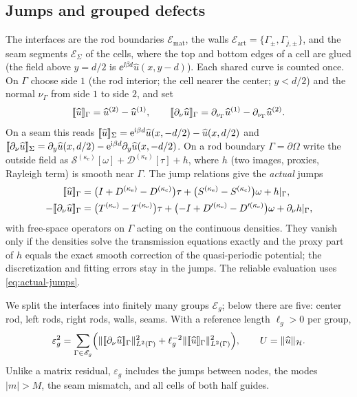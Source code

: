 \subsection{Jumps and grouped defects}\label{sec:jumps}
The interfaces are the rod boundaries $\mathscr E_{\mathrm{mat}}$, the walls
$\mathscr E_{\mathrm{art}}=\{\Gamma_\pm,\Gamma_{j,\pm}\}$, and the seam segments
$\mathscr E_\Sigma$ of the cells, where the top and bottom edges of a cell are
glued (the field above $y=d/2$ is $\ee^{\ii\beta d}\widehat u(x,y-d)$). Each
shared curve is counted once. On $\Gamma$ choose side $1$ (the rod interior;
the cell nearer the center; $y<d/2$) and the normal $\nu_\Gamma$ from side $1$
to side $2$, and set
\begin{equation}\label{eq:jumps}
  \llbracket \widehat u\rrbracket_\Gamma=\widehat u^{(2)}-\widehat u^{(1)},\qquad
  \llbracket \partial_\nu\widehat u\rrbracket_\Gamma=\partial_{\nu_\Gamma}\widehat u^{(1)}
  -\partial_{\nu_\Gamma}\widehat u^{(2)} .
\end{equation}
On a seam this reads $\llbracket \widehat u\rrbracket_\Sigma=\mathrm{e}^{\mathrm{i}\beta d}\widehat u(x,-d/2)-\widehat u(x,d/2)$
and $\llbracket \partial_\nu\widehat u\rrbracket_\Sigma=\partial_y\widehat u(x,d/2)-\mathrm{e}^{\mathrm{i}\beta d}
\partial_y\widehat u(x,-d/2)$. On a rod boundary $\Gamma=\partial\Omega$ write the
outside field as $\mathcal S^{(\kappa_{\mathrm e})}[\omega]+\mathcal D^{(\kappa_{\mathrm e})}[\tau]+h$,
where $h$ (two images, proxies, Rayleigh term) is smooth near $\Gamma$. The jump
relations give the \emph{actual} jumps
\begin{equation}\label{eq:actual-jumps}
\begin{aligned}
  \llbracket \widehat u\rrbracket_\Gamma&=\bigl(I+D^{(\kappa_{\mathrm e})}-D^{(\kappa_{\mathrm c})}\bigr)\tau
  +\bigl(S^{(\kappa_{\mathrm e})}-S^{(\kappa_{\mathrm c})}\bigr)\omega+h|_\Gamma,\\
  -\llbracket \partial_\nu\widehat u\rrbracket_\Gamma&=\bigl(T^{(\kappa_{\mathrm e})}-T^{(\kappa_{\mathrm c})}\bigr)\tau
  +\bigl(-I+D'^{(\kappa_{\mathrm e})}-D'^{(\kappa_{\mathrm c})}\bigr)\omega+\partial_\nu h|_\Gamma,
\end{aligned}
\end{equation}
with free-space operators on $\Gamma$ acting on the continuous densities. They
vanish only if the densities solve the transmission equations exactly and the
proxy part of $h$ equals the exact smooth correction of the quasi-periodic
potential; the discretization and fitting errors stay in the jumps. The reliable evaluation uses \eqref{eq:actual-jumps}.

We split the interfaces into finitely many groups $\mathscr E_g$; below there are
five: center rod, left rods, right rods, walls, seams. With a reference length
$\ell_g>0$ per group,
\begin{equation}\label{eq:defect}
  \varepsilon_g^2=\sum_{\Gamma\in\mathscr E_g}\Bigl(\|\llbracket \partial_\nu\widehat u\rrbracket_\Gamma\|^2_{L^2(\Gamma)}
  +\ell_g^{-2}\|\llbracket \widehat u\rrbracket_\Gamma\|^2_{L^2(\Gamma)}\Bigr),\qquad
  U=\|\widehat u\|_{\mathcal H}.
\end{equation}
Unlike a matrix residual, $\varepsilon_g$ includes the jumps between nodes, the
modes $|m|>M$, the seam mismatch, and all cells of both half guides.

